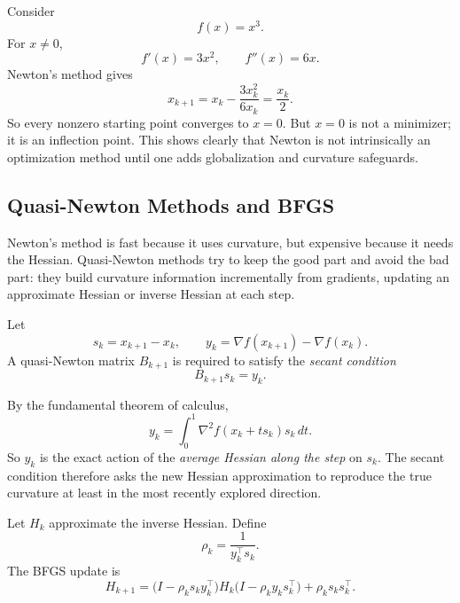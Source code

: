 \begin{remark}
	Consider
	\[
		f(x)=x^3.
	\]
	For $x\neq 0$,
	\[
		f'(x)=3x^2,
		\qquad
		f''(x)=6x.
	\]
	Newton's method gives
	\[
		x_{k+1}=x_k-\frac{3x_k^2}{6x_k}=\frac{x_k}{2}.
	\]
	So every nonzero starting point converges to $x=0$. But $x=0$ is not a minimizer; it is an inflection point. This shows clearly that Newton is not intrinsically an optimization method until one adds globalization and curvature safeguards.
\end{remark}

\subsection{Quasi-Newton Methods and BFGS}
\label{sec:l2-quasi-newton-methods-and-bfgs}

\begin{intuition}
	Newton's method is fast because it uses curvature, but expensive because it needs the Hessian. Quasi-Newton methods try to keep the good part and avoid the bad part: they build curvature information incrementally from gradients, updating an approximate Hessian or inverse Hessian at each step.
\end{intuition}

\begin{definition}\label{def:l2-secant-condition}
	Let
	\[
		s_k=x_{k+1}-x_k,
		\qquad
		y_k=\nabla f(x_{k+1})-\nabla f(x_k).
	\]
	A quasi-Newton matrix $B_{k+1}$ is required to satisfy the \emph{secant condition}
	\[
		B_{k+1}s_k=y_k.
	\]
\end{definition}

\begin{remark}
	By the fundamental theorem of calculus,
	\[
		y_k
		=
		\int_0^1 \nabla^2 f(x_k+t s_k)s_k\,dt.
	\]
	So $y_k$ is the exact action of the \emph{average Hessian along the step} on $s_k$. The secant condition therefore asks the new Hessian approximation to reproduce the true curvature at least in the most recently explored direction.
\end{remark}

\begin{definition}\label{def:l2-bfgs-inverse-hessian-update}
	Let $H_k$ approximate the inverse Hessian. Define
	\[
		\rho_k=\frac{1}{y_k^\top s_k}.
	\]
	The BFGS update is
	\[
		H_{k+1}
		=
		\bigl(I-\rho_k s_k y_k^\top\bigr)H_k\bigl(I-\rho_k y_k s_k^\top\bigr)
		+\rho_k s_k s_k^\top.
	\]
\end{definition}

